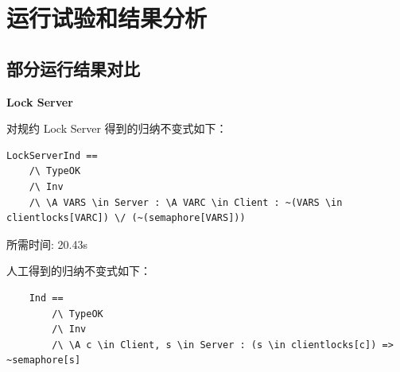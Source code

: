 \chapter{运行试验和结果分析}\label{chap:run-analysis}

\section{部分运行结果对比}
\textbf{Lock Server}

\rltla 对规约 Lock Server 得到的归纳不变式如下：
\begin{lstlisting}
LockServerInd == 
    /\ TypeOK 
    /\ Inv
    /\ \A VARS \in Server : \A VARC \in Client : ~(VARS \in clientlocks[VARC]) \/ (~(semaphore[VARS])) 
\end{lstlisting}
所需时间: 20.43s

人工得到的归纳不变式如下：
\begin{lstlisting}
    Ind == 
        /\ TypeOK
        /\ Inv
        /\ \A c \in Client, s \in Server : (s \in clientlocks[c]) => ~semaphore[s]
\end{lstlisting}


